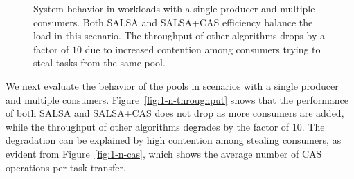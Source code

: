 \begin{figure}[tbh]
	\centering
  \vspace{-10pt}
	\caption{\footnotesize{System behavior in workloads with a single producer and multiple consumers. 
	Both SALSA and SALSA+CAS efficiency balance the load in this scenario. The throughput of other algorithms drops by a factor of $10$ due to increased contention among consumers trying to steal tasks from the same pool.}}
	\vspace{-5pt}
	\label{fig:1-n-perf}
\end{figure}

We next evaluate the behavior of the pools in scenarios with a single producer and multiple consumers. 
Figure~\ref{fig:1-n-throughput} shows that the performance of both SALSA and SALSA+CAS does not drop as more consumers are added, while the throughput of other algorithms degrades by the factor of $10$. 
The degradation can be explained by high contention among stealing consumers, as evident from Figure~\ref{fig:1-n-cas}, which shows the average number of CAS operations per task transfer. %


